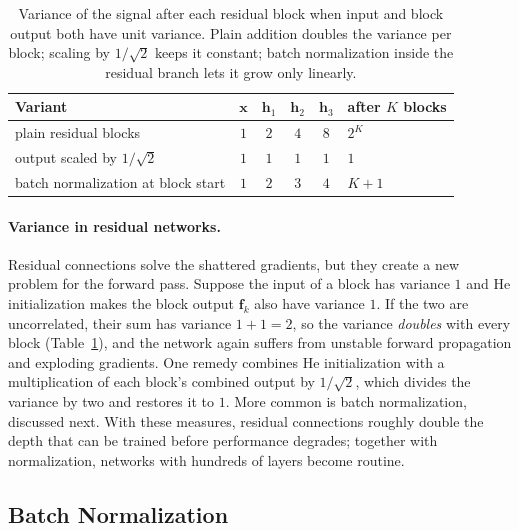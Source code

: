 \begin{table}[!ht]
  \centering
  \begin{tabular}{@{}lccccl@{}}
    \toprule
    Variant & $\mathbf{x}$ & $\mathbf{h}_1$ & $\mathbf{h}_2$ & $\mathbf{h}_3$ &
      after $K$ blocks \\
    \midrule
    plain residual blocks & $1$ & $2$ & $4$ & $8$ & $2^K$ \\
    output scaled by $1/\sqrt{2}$ & $1$ & $1$ & $1$ & $1$ & $1$ \\
    batch normalization at block start & $1$ & $2$ & $3$ & $4$ & $K+1$ \\
    \bottomrule
  \end{tabular}
  \caption{Variance of the signal after each residual block when input and
  block output both have unit variance. Plain addition doubles the variance per
  block; scaling by $1/\sqrt{2}$ keeps it constant; batch normalization inside
  the residual branch lets it grow only linearly.}
  \label{tab:resnet-variance}
\end{table}

\paragraph{Variance in residual networks.}
Residual connections solve the shattered gradients, but they create a new
problem for the forward pass. Suppose the input of a block has variance $1$ and
He initialization makes the block output $\mathbf{f}_k$ also have variance $1$.
If the two are uncorrelated, their sum has variance $1 + 1 = 2$, so the variance
\emph{doubles} with every block (Table~\ref{tab:resnet-variance}), and the
network again suffers from unstable forward propagation and exploding
gradients. One remedy combines He initialization with a multiplication of each
block's combined output by $1/\sqrt{2}$, which divides the variance by two and
restores it to $1$. More common is batch normalization, discussed next. With
these measures, residual connections roughly double the depth that can be
trained before performance degrades; together with normalization, networks with
hundreds of layers become routine.

\subsection{Batch Normalization}

